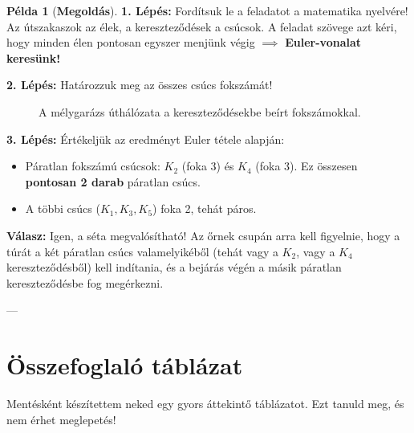 \documentclass[a4paper,12pt]{article}
\theoremstyle{definition} %
\newtheorem*{example}{Példa}
\begin{document}
\begin{example}[\textbf{Megoldás}]
\textbf{1. Lépés:} Fordítsuk le a feladatot a matematika nyelvére!
Az útszakaszok az élek, a kereszteződések a csúcsok. A feladat szövege azt kéri, hogy minden élen pontosan egyszer menjünk végig $\implies$ \textbf{Euler-vonalat keresünk!}

\textbf{2. Lépés:} Határozzuk meg az összes csúcs fokszámát!

\begin{figure}[H]
    \centering
    \caption{A mélygarázs úthálózata a kereszteződésekbe beírt fokszámokkal.}
    \label{fig:parking_graph}
\end{figure}

\textbf{3. Lépés:} Értékeljük az eredményt Euler tétele alapján:
\begin{itemize}
    \item Páratlan fokszámú csúcsok: $K_2$ (foka 3) és $K_4$ (foka 3). Ez összesen \textbf{pontosan 2 darab} páratlan csúcs.
    \item A többi csúcs ($K_1, K_3, K_5$) foka 2, tehát páros.
\end{itemize}

\textbf{Válasz:} Igen, a séta megvalósítható! Az őrnek csupán arra kell figyelnie, hogy a túrát a két páratlan csúcs valamelyikéből (tehát vagy a $K_2$, vagy a $K_4$ kereszteződésből) kell indítania, és a bejárás végén a másik páratlan kereszteződésbe fog megérkezni.
\end{example}

---

\section{Összefoglaló táblázat}

Mentésként készítettem neked egy gyors áttekintő táblázatot. Ezt tanuld meg, és nem érhet meglepetés!
\end{document}
